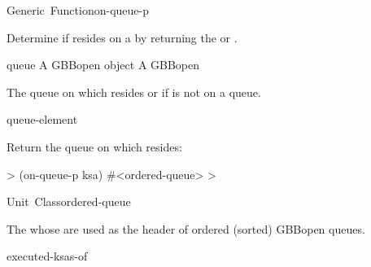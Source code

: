 \documentclass[10pt,twoside,english,pdftex]{article}
\begin{document}
\begin{functiondoc}{Generic~Function}{on-queue-p}{ 
    }
%
%

\fnsyntax

\fnpurpose Determine if  resides on a
  by returning the  or \nil.

\fnmethods
{}

\fnpackage {}

\fnmodule {}

\fnargs
\begin{args}{queue}
 A GBBopen  object
\arg[queue] A GBBopen 
\end{args}

\fnreturns The  queue on which 
resides or \nil{} if  is not on a queue.
  
\begin{alsos}{queue-element}
\end{alsos}

\fnexample
Return the queue on which  resides:
%
\W\supp
\begin{example}
  > (on-queue-p ksa)
  #<ordered-queue>
  >
\end{example}

\end{functiondoc}


\begin{functiondoc}{Unit~Class}{ordered-queue}{}
%
%

\fnsyntax

\fnpackage {}

\fnmodule {}

\fndescription The  whose  are used 
as the header of ordered (sorted) GBBopen queues.

\begin{alsos}{executed-ksas-of}
\also[on-queue-p]
\also[queue]
\end{alsos}

\end{functiondoc}
\end{document}
